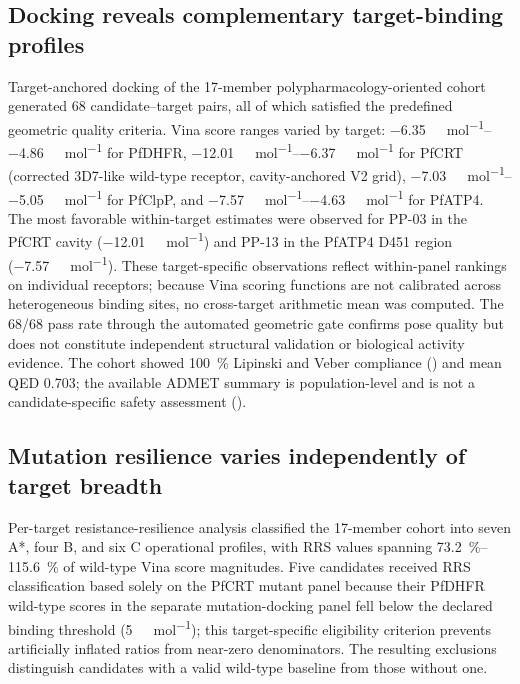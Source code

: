\documentclass[journal=jcisd8,manuscript=article]{achemso}
\begin{document}
\subsection{Docking reveals complementary target-binding profiles}\label{sec:results_docking}
Target-anchored docking of the 17-member polypharmacology-oriented cohort generated \num{68} candidate--target pairs, all of which satisfied the predefined geometric quality criteria. Vina score ranges varied by target: \qtyrange{-6.35}{-4.86}{\kilo\calorie\per\mole} for PfDHFR, \qtyrange{-12.01}{-6.37}{\kilo\calorie\per\mole} for PfCRT (corrected 3D7-like wild-type receptor, cavity-anchored V2 grid), \qtyrange{-7.03}{-5.05}{\kilo\calorie\per\mole} for PfClpP, and \qtyrange{-7.57}{-4.63}{\kilo\calorie\per\mole} for PfATP4. The most favorable within-target estimates were observed for PP-03 in the PfCRT cavity (\qty{-12.01}{\kilo\calorie\per\mole}) and PP-13 in the PfATP4 D451 region (\qty{-7.57}{\kilo\calorie\per\mole}). These target-specific observations reflect within-panel rankings on individual receptors; because Vina scoring functions are not calibrated across heterogeneous binding sites, no cross-target arithmetic mean was computed. The \num{68}/\num{68} pass rate through the automated geometric gate confirms pose quality but does not constitute independent structural validation or biological activity evidence. The cohort showed \qty{100}{\percent} Lipinski and Veber compliance () and mean QED \num{0.703}; the available ADMET summary is population-level and is not a candidate-specific safety assessment ().

\subsection{Mutation resilience varies independently of target breadth}\label{sec:results_mutation}
Per-target resistance-resilience analysis classified the 17-member cohort into seven A*, four B, and six C operational profiles, with RRS values spanning \qtyrange{73.2}{115.6}{\percent} of wild-type Vina score magnitudes. Five candidates received RRS classification based solely on the PfCRT mutant panel because their PfDHFR wild-type scores in the separate mutation-docking panel fell below the declared binding threshold (\qty{5}{\kilo\calorie\per\mole}); this target-specific eligibility criterion prevents artificially inflated ratios from near-zero denominators. The resulting exclusions distinguish candidates with a valid wild-type baseline from those without one.
\end{document}
